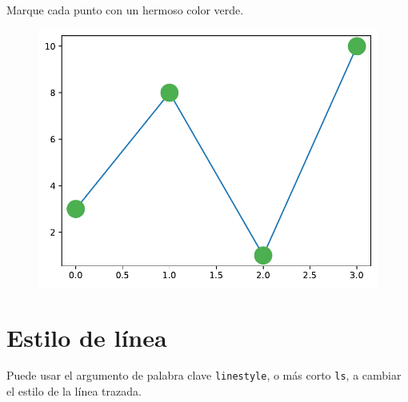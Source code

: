 \begin{code} Marque cada punto con un hermoso color verde.

\begin{Shaded}
\begin{Highlighting}[]
\OperatorTok{=} \OperatorTok{=} \OperatorTok{=} \OperatorTok{=} \NormalTok{)}
\end{Highlighting}
\end{Shaded}

\begin{figure}
  \centering
  \includegraphics[scale=0.6]{img/grafica1015.pdf}
\end{figure}

\end{code}

\section{Estilo de línea}

Puede usar el argumento de palabra clave \texttt{linestyle}, o más corto
\texttt{ls}, a cambiar el estilo de la línea trazada.\\

